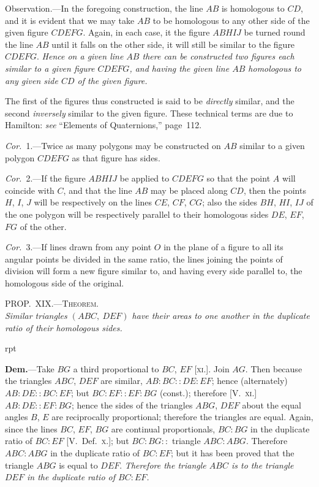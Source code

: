 \documentclass[oneside]{book}
\newcommand\myprop[2]{
\bigskip\Needspace*{4\baselineskip}\begin{center}\textsc{#1}\\\medskip\emph{#2}\par\end{center}
}
\newcommand\imgflow[3]{
\setcounter{wrapwidth}{#1}
\begin{wrapfigure}[#2]{r}{\value{wrapwidth}pt}
\begin{center}
\vspace{-0.3in}
\end{center}
\end{wrapfigure}
}
\begin{document}
\smallskip
\begin{footnotesize}
\textsf{Observation.}---In the foregoing construction, the line $AB$ is
homologous to $CD$, and it is evident that we may take $AB$ to
be homologous to any other side of the given figure $CDEFG$.
Again, in each case, it the figure $ABHIJ$ be turned round the line
$AB$ until it falls on the other side, it will still be similar to the
figure $CDEFG$. \emph{Hence on a given line $AB$ there can be constructed
two figures each similar to a given figure $CDEFG$, and having the
given line $AB$ homologous to any given side $CD$ of the given figure.}

The first of the figures thus constructed is said to be \emph{directly}
similar, and the second \emph{inversely} similar to the given figure.
These technical terms are due to Hamilton: \emph{see} ``Elements of
Quaternions,'' page~112.
\par\end{footnotesize}

\emph{Cor.}~1.---Twice as many polygons may be constructed
on $AB$ similar to a given polygon $CDEFG$ as
that figure has sides.

\emph{Cor.}~2.---If the figure $ABHIJ$ be applied to $CDEFG$
so that the point $A$ will coincide with $C$, and that the
line $AB$ may be placed along $CD$, then the points $H$, $I$, $J$
will be respectively on the lines $CE$, $CF$, $CG$; also the
sides $BH$, $HI$, $IJ$ of the one polygon will be respectively
parallel to their homologous sides $DE$, $EF$, $FG$
of the other.

\emph{Cor.}~3.---If lines drawn from any point $O$ in the
plane of a figure to all its angular points be divided in
the same ratio, the lines joining the points of division
will form a new figure similar to, and having every
side parallel to, the homologous side of the original.

\myprop{PROP\@.~XIX\@.---Theorem.}{Similar triangles $(ABC,\ DEF)$ have their areas to
one another in the duplicate ratio of their homologous
sides.}

\imgflow{178}{9}{f196}

\textbf{Dem.}---Take $BG$ a third proportional to $BC$, $EF$
[\textsc{xi.}]. Join $AG$. Then
because the triangles
$ABC$, $DEF$ are similar,
$AB : BC :: DE : EF$;
hence (alternately) $AB
: DE :: BC : EF$; but
$BC : EF :: EF : BG$
(const.); therefore [V.~\textsc{xi.}]
$AB : DE :: EF :
BG$; hence the sides of the triangles $ABG$, $DEF$ about
the equal angles $B$, $E$ are reciprocally proportional;
therefore the triangles are equal. Again, since the
lines $BC$, $EF$, $BG$ are continual proportionals, $BC : BG$
in the duplicate ratio of $BC : EF$ [V.~Def.~\textsc{x.}]; but
$BC : BG ::$ triangle $ABC : ABG$. Therefore $ABC : ABG$
in the duplicate ratio of $BC : EF$; but it has been
proved that the triangle $ABG$ is equal to $DEF$. \emph{Therefore
the triangle $ABC$ is to the triangle $DEF$ in the
duplicate ratio of $BC : EF$.}
\end{document}
